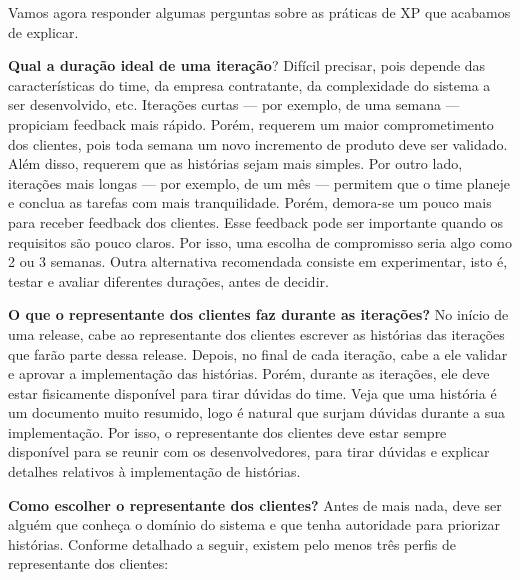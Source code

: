 \documentclass[
  11pt,
  twoside]{book}
\begin{document}
Vamos agora responder algumas perguntas sobre as práticas de XP que
acabamos de explicar.

\textbf{Qual a duração ideal de uma iteração}? Difícil precisar, pois
depende das características do time, da empresa contratante, da
complexidade do sistema a ser desenvolvido, etc. Iterações curtas ---
por exemplo, de uma semana --- propiciam feedback mais rápido. Porém,
requerem um maior comprometimento dos clientes, pois toda semana um novo
incremento de produto deve ser validado. Além disso, requerem que as
histórias sejam mais simples. Por outro lado, iterações mais longas ---
por exemplo, de um mês --- permitem que o time planeje e conclua as
tarefas com mais tranquilidade. Porém, demora-se um pouco mais para
receber feedback dos clientes. Esse feedback pode ser importante quando
os requisitos são pouco claros. Por isso, uma escolha de compromisso
seria algo como 2 ou 3 semanas. Outra alternativa recomendada consiste
em experimentar, isto é, testar e avaliar diferentes durações, antes de
decidir.

\textbf{O que o representante dos clientes faz durante as iterações?} No
início de uma release, cabe ao representante dos clientes escrever as
histórias das iterações que farão parte dessa release. Depois, no final
de cada iteração, cabe a ele validar e aprovar a implementação das
histórias. Porém, durante as iterações, ele deve estar fisicamente
disponível para tirar dúvidas do time. Veja que uma história é um
documento muito resumido, logo é natural que surjam dúvidas durante a
sua implementação. Por isso, o representante dos clientes deve estar
sempre disponível para se reunir com os desenvolvedores, para tirar
dúvidas e explicar detalhes relativos à implementação de histórias.

\textbf{Como escolher o representante dos clientes?} Antes de mais nada,
deve ser alguém que conheça o domínio do sistema e que tenha autoridade
para priorizar histórias. Conforme detalhado a seguir, existem pelo
menos três perfis de representante dos clientes:
\end{document}
